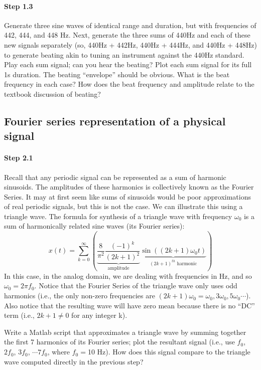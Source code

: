 \paragraph{Step 1.3} Generate three sine waves of identical range and
duration, but with frequencies of 442, 444, and 448 Hz. Next, generate
the three sums of 440Hz and each of these new signals separately (so,
440Hz + 442Hz, 440Hz + 444Hz, and 440Hz + 448Hz) to generate beating
akin to tuning an instrument against the 440Hz standard. Play each sum
signal; can you hear the beating? Plot each sum signal for its full 1s
duration. The beating ``envelope'' should be obvious. What is the beat
frequency in each case? How does the beat frequency and amplitude
relate to the textbook discussion of beating?


\subsection{Fourier series representation of a physical signal}


\paragraph{Step 2.1} Recall that any periodic signal can be
represented as a sum of harmonic sinusoids.  The amplitudes of these
harmonics is collectively known as the Fourier Series. It may at first seem like
sums of sinusoids would be poor approximations of real periodic
signals, but this is not the case. We can illustrate this using a
triangle wave. The formula for synthesis of a triangle wave with
frequency $\omega_0$ is a sum of harmonically related sine waves (its
Fourier series):
  \[
  x(t) = \sum_{k=0}^{\infty}
  \left( 
    \underbrace{ \frac{8}{\pi^2} \frac{(-1)^k}{(2k+ 1)^2} }_{ \text{amplitude} } 
    \underbrace{ \sin((2k+1)\omega_0 t) }_{ (2k+1)^{th}\text{ harmonic} } 
  \right)
  \]
  In this case, in the analog domain, we are dealing with frequencies
  in Hz, and so $\omega_0 = 2\pi f_0$. Notice that the Fourier Series
  of the triangle wave only uses odd harmonics (i.e., the only
  non-zero frequencies are $(2k+1)\omega_0=\omega_0, 3\omega_0,
  5\omega_0 \cdots$). Also notice that the resulting wave will have zero
  mean because there is no ``DC'' term (i.e., $2k+1 \neq 0$ for any
  integer k).

  Write a Matlab script that approximates a triangle wave by summing
  together the first 7 harmonics of its Fourier series; plot the
  resultant signal (i.e., use $f_0$, $2f_0$, $3f_0$, $\cdots 7f_0$,
  where $f_0=$10 Hz). How does this signal compare to the triangle
  wave computed directly in the previous step?



